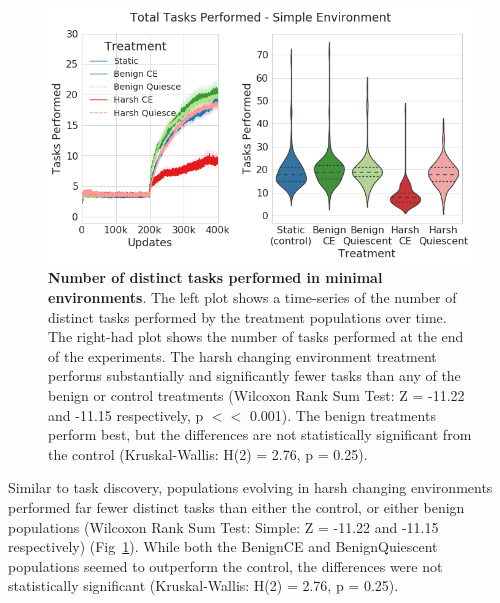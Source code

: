 \documentclass[10pt,letterpaper]{article}
\begin{document}
	\begin{figure}[!h]
	\includegraphics[width=0.95\columnwidth]{figures/LTE/lte-simple-task_performance.png}
	\caption{\textbf{Number of distinct tasks performed in minimal environments}. The left plot shows a time-series of the number of distinct tasks performed by the treatment populations over time. The right-had plot shows the number of tasks performed at the end of the experiments. The harsh changing environment treatment performs substantially and significantly fewer tasks than any of the benign or control treatments (Wilcoxon Rank Sum Test: Z = -11.22 and -11.15 respectively, p $<<$ 0.001). The benign treatments perform best, but the differences are not statistically significant from the control (Kruskal-Wallis: H(2) = 2.76, p = 0.25). %
	}
	\label{fig:lte-simple-task_performance}
	\end{figure}  


Similar to task discovery, populations evolving in harsh changing environments performed far fewer distinct tasks than either the control, or either benign populations (Wilcoxon Rank Sum Test: Simple: Z = -11.22 and -11.15 respectively) (Fig~\ref{fig:lte-simple-task_performance}). While both the BenignCE and BenignQuiescent
populations seemed to outperform the control, 
the differences were not statistically significant (Kruskal-Wallis: H(2) = 2.76, p = 0.25).
\end{document}
